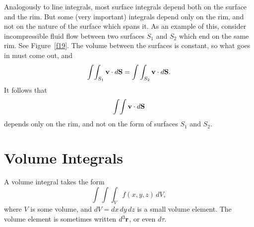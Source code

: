 Analogously to line integrals, most 
surface  integrals depend both on the surface and the rim.
But some (very important) integrals depend only on the rim, and not on the nature
of the surface which spans it. As an example of this, consider incompressible fluid
flow between two surfaces $S_1$ and $S_2$ which end on the same rim. See Figure~\ref{f19}. 
The volume between the surfaces is constant, so what goes in must come out, and
\begin{equation}
\int\!\int_{S_1} {\bf v}\cdot d{\bf S} = \int\int_{S_2} {\bf v}\cdot d{\bf S}.
\end{equation}
It follows that
\begin{equation}
\int\!\int {\bf v}\cdot d{\bf S} 
\end{equation}
depends only on the rim, and not on the form of surfaces $S_1$ and $S_2$. 

\section{Volume Integrals}
A volume integral takes the form
\begin{equation}
\int\!\int\!\int_V f(x,y,z)\,dV,
\end{equation}
where $V$ is some volume, and $dV = dx \,dy \,dz$ is a small volume element. The
volume element is sometimes written $d^3{\bf r}$, or even $d\tau$. 

